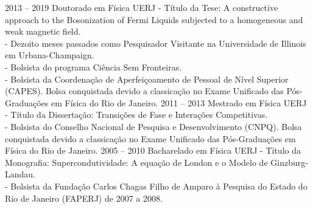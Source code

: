\documentclass[9pt]{developercv} %
\begin{document}
\begin{entrylist}
	\entry
	{2013 -- 2019}
	{Doutorado em F\'isica}
	{UERJ}
	{- T\'itulo da Tese: A constructive approach to the Bosonization of Fermi Liquids subjected to a homogeneous and weak magnetic field.\\ 
		- Dezoito meses passados como Pesquisador Visitante na Universidade de Illinois em Urbana-Champaign.\\
		- Bolsista do programa Ci\^encia Sem Fronteiras.\\
		- Bolsista da Coordenação de Aperfeiçoamento de Pessoal de Nível Superior (CAPES). Bolsa conquistada devido a classicação no Exame Unificado das P\'os-Graduações em F\'isica do Rio de Janeiro.}
	\entry
	{2011 -- 2013}
	{Mestrado em Física}
	{UERJ}
	{- T\'itulo da Dissertação: Transições de Fase e Interações Competitivas.\\
		- Bolsista do Conselho Nacional de Pesquisa e Desenvolvimento (CNPQ). Bolsa conquistada devido a classicação no Exame Unificado das P\'os-Graduações em F\'isica do Rio de Janeiro.}
	\entry
	{2005 -- 2010}
	{Bacharelado em Física}
	{UERJ}
	{- Título da Monografia: Supercondutividade: A equação de London e o Modelo de Ginzburg-Landau.\\
		- Bolsista da Fundação Carlos Chagas Filho de Amparo à Pesquisa do Estado do Rio de  Janeiro (FAPERJ) de 2007 a 2008.}
\end{entrylist}

\end{document}
